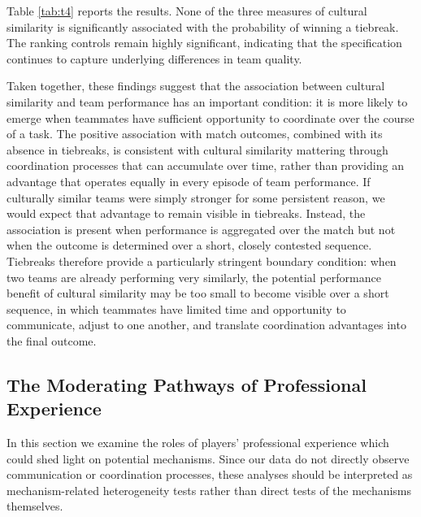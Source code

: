 \documentclass[10pt]{article}
\begin{document}
Table \ref{tab:t4} reports the results. None of the three measures of cultural similarity is significantly associated with the probability of winning a tiebreak.  The ranking controls remain highly significant, indicating that the specification continues to capture underlying differences in team quality.


Taken together, these findings suggest that the association between cultural similarity and team performance has an important condition: it is more likely to emerge when teammates have sufficient opportunity to coordinate over the course of a task. The positive association with match outcomes, combined with its absence in tiebreaks, is consistent with cultural similarity mattering through coordination processes that can accumulate over time, rather than providing an advantage that operates equally in every episode of team performance. If culturally similar teams were simply stronger for some persistent reason, we would expect that advantage to remain visible in tiebreaks. Instead, the association is present when performance is aggregated over the match but not when the outcome is determined over a short, closely contested sequence. Tiebreaks therefore provide a particularly stringent boundary condition: when two teams are already performing very similarly, the potential performance benefit of cultural similarity may be too small to become visible over a short sequence, in which teammates have limited time and opportunity to communicate, adjust to one another, and translate coordination advantages into the final outcome.





\subsection{The Moderating Pathways of Professional Experience}

In this section we examine the roles of players’ professional experience which could shed light on potential mechanisms. Since our data do not directly observe communication or coordination processes, these analyses should be interpreted as mechanism-related heterogeneity tests rather than direct tests of the mechanisms themselves. %
\end{document}
